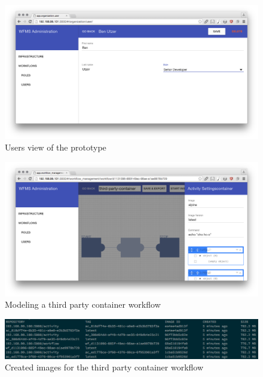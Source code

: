   \begin{figure}[htbp]
    \centering
    \includegraphics[width=\textwidth]{./content/images/usecase/case_study_9.png}
    \caption{Users view of the prototype}
    \label{fig:dev_user}
  \end{figure}

  \begin{figure}[htbp]
    \centering
    \includegraphics[width=\textwidth]{./content/images/usecase/case_study_10.png}
    \caption{Modeling a third party container workflow}
    \label{fig:tpc_wf}
  \end{figure}

  \begin{figure}[htbp]
    \centering
    \includegraphics[width=\textwidth]{./content/images/usecase/case_study_12.png}
    \caption{Created images for the third party container workflow}
    \label{fig:tpc_images}
  \end{figure}


